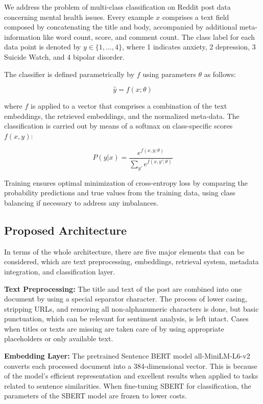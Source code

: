 \documentclass[11pt]{article}
\begin{document}
We address the problem of multi-class classification on Reddit post data concerning mental health issues. Every example $x$ comprises a text field composed by concatenating the title and body, accompanied by additional meta-information like word count, score, and comment count. The class label for each data point is denoted by $y \in \{1, \ldots, 4\}$, where 1 indicates anxiety, 2 depression, 3 Suicide Watch, and 4 bipolar disorder.

The classifier is defined parametrically by $f$ using parameters $\theta$ as follows:

\begin{equation}
\hat{y}=f(x; \theta)
\end{equation}

where $f$ is applied to a vector that comprises a combination of the text embeddings, the retrieved embeddings, and the normalized meta-data. The classification is carried out by means of a softmax on class-specific scores $f(x, y)$:

\begin{equation}
P(y | x) = \frac{e^{f(x, y; \theta)}}{\sum_{y'} e^{f(x, y'; \theta)}}
\end{equation}

Training ensures optimal minimization of cross-entropy loss by comparing the probability predictions and true values from the training data, using class balancing if necessary to address any imbalances.

\subsection{Proposed Architecture}

In terms of the whole architecture, there are five major elements that can be considered, which are text preprocessing, embeddings, retrieval system, metadata integration, and classification layer.

\textbf{Text Preprocessing:} The title and text of the post are combined into one document by using a special separator character. The process of lower casing, stripping URLs, and removing all non-alphanumeric characters is done, but basic punctuation, which can be relevant for sentiment analysis, is left intact. Cases when titles or texts are missing are taken care of by using appropriate placeholders or only available text.

\textbf{Embedding Layer:} The pretrained Sentence BERT model all-MiniLM-L6-v2 converts each processed document into a 384-dimensional vector. This is because of the model’s efficient representation and excellent results when applied to tasks related to sentence similarities. When fine-tuning SBERT for classification, the parameters of the SBERT model are frozen to lower costs.
\end{document}
